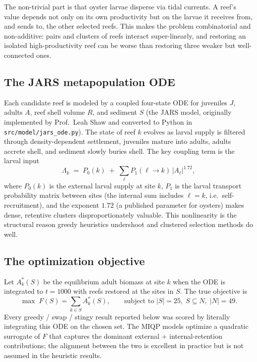 \documentclass[11pt]{article}
\begin{document}
The non-trivial part is that oyster larvae disperse via tidal currents. A reef's value depends not only on its own productivity but on the larvae it receives from, and sends to, the other selected reefs. This makes the problem combinatorial and non-additive: pairs and clusters of reefs interact super-linearly, and restoring an isolated high-productivity reef can be worse than restoring three weaker but well-connected ones.

\subsection{The JARS metapopulation ODE}

Each candidate reef is modeled by a coupled four-state ODE for juveniles $J$, adults $A$, reef shell volume $R$, and sediment $S$ (the JARS model, originally implemented by Prof.\ Leah Shaw and converted to Python in \texttt{src/model/jars\_ode.py}). The state of reef $k$ evolves as larval supply is filtered through density-dependent settlement, juveniles mature into adults, adults accrete shell, and sediment slowly buries shell. The key coupling term is the larval input
\[
\Lambda_k \;=\; P_0(k) \;+\; \sum_{\ell} P_1(\ell \to k)\,|A_\ell|^{1.72},
\]
where $P_0(k)$ is the external larval supply at site $k$, $P_1$ is the larval transport probability matrix between sites (the internal sum includes $\ell=k$, i.e.\ self-recruitment), and the exponent $1.72$ (a published parameter for oysters) makes dense, retentive clusters disproportionately valuable. This nonlinearity is the structural reason greedy heuristics undershoot and clustered selection methods do well.

\subsection{The optimization objective}

Let $A_k^*(S)$ be the equilibrium adult biomass at site $k$ when the ODE is integrated to $t=1000$ with reefs restored at the sites in $S$. The true objective is
\[
\max\;F(S) = \sum_{k \in S} A_k^*(S), \qquad \text{subject to } |S|=25,\; S \subseteq N,\; |N|=49.
\]
Every greedy / swap / stingy result reported below was scored by literally integrating this ODE on the chosen set. The MIQP models optimize a quadratic surrogate of $F$ that captures the dominant external + internal-retention contributions; the alignment between the two is excellent in practice but is not assumed in the heuristic results.
\end{document}
